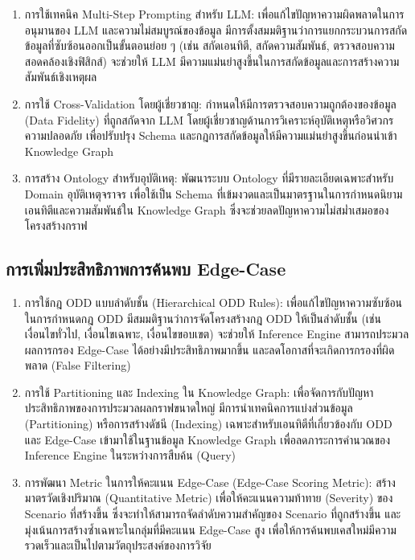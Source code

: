\begin{enumerate}
    \item การใช้เทคนิค Multi-Step Prompting สำหรับ LLM: เพื่อแก้ไขปัญหาความผิดพลาดในการอนุมานของ LLM และความไม่สมบูรณ์ของข้อมูล มีการตั้งสมมติฐานว่าการแยกกระบวนการสกัดข้อมูลที่ซับซ้อนออกเป็นขั้นตอนย่อย ๆ (เช่น สกัดเอนทิตี, สกัดความสัมพันธ์, ตรวจสอบความสอดคล้องเชิงฟิสิกส์) จะช่วยให้ LLM มีความแม่นยำสูงขึ้นในการสกัดข้อมูลและการสร้างความสัมพันธ์เชิงเหตุผล
    \item การใช้ Cross-Validation โดยผู้เชี่ยวชาญ: กำหนดให้มีการตรวจสอบความถูกต้องของข้อมูล (Data Fidelity) ที่ถูกสกัดจาก LLM โดยผู้เชี่ยวชาญด้านการวิเคราะห์อุบัติเหตุหรือวิศวกรความปลอดภัย เพื่อปรับปรุง Schema และกฎการสกัดข้อมูลให้มีความแม่นยำสูงขึ้นก่อนนำเข้า Knowledge Graph
    \item การสร้าง Ontology สำหรับอุบัติเหตุ: พัฒนาระบบ Ontology ที่มีรายละเอียดเฉพาะสำหรับ Domain อุบัติเหตุจราจร เพื่อใช้เป็น Schema ที่เข้มงวดและเป็นมาตรฐานในการกำหนดนิยามเอนทิตีและความสัมพันธ์ใน Knowledge Graph ซึ่งจะช่วยลดปัญหาความไม่สม่ำเสมอของโครงสร้างกราฟ
\end{enumerate}

\subsection{การเพิ่มประสิทธิภาพการค้นพบ Edge-Case}\label{subsec:improving-edge-case-discovery}

\begin{enumerate}
    \item การใช้กฎ ODD แบบลำดับชั้น (Hierarchical ODD Rules): เพื่อแก้ไขปัญหาความซับซ้อนในการกำหนดกฎ ODD มีสมมติฐานว่าการจัดโครงสร้างกฎ ODD ให้เป็นลำดับชั้น (เช่น เงื่อนไขทั่วไป, เงื่อนไขเฉพาะ, เงื่อนไขขอบเขต) จะช่วยให้ Inference Engine สามารถประมวลผลการกรอง Edge-Case ได้อย่างมีประสิทธิภาพมากขึ้น และลดโอกาสที่จะเกิดการกรองที่ผิดพลาด (False Filtering)
    \item การใช้ Partitioning และ Indexing ใน Knowledge Graph: เพื่อจัดการกับปัญหาประสิทธิภาพของการประมวลผลกราฟขนาดใหญ่ มีการนำเทคนิคการแบ่งส่วนข้อมูล (Partitioning) หรือการสร้างดัชนี (Indexing) เฉพาะสำหรับเอนทิตีที่เกี่ยวข้องกับ ODD และ Edge-Case เข้ามาใช้ในฐานข้อมูล Knowledge Graph เพื่อลดภาระการคำนวณของ Inference Engine ในระหว่างการสืบค้น (Query)
    \item การพัฒนา Metric ในการให้คะแนน Edge-Case (Edge-Case Scoring Metric): สร้างมาตรวัดเชิงปริมาณ (Quantitative Metric) เพื่อให้คะแนนความท้าทาย (Severity) ของ Scenario ที่สร้างขึ้น ซึ่งจะทำให้สามารถจัดลำดับความสำคัญของ Scenario ที่ถูกสร้างขึ้น และมุ่งเน้นการสร้างซ้ำเฉพาะในกลุ่มที่มีคะแนน Edge-Case สูง เพื่อให้การค้นพบเคสใหม่มีความรวดเร็วและเป็นไปตามวัตถุประสงค์ของการวิจัย
\end{enumerate}


